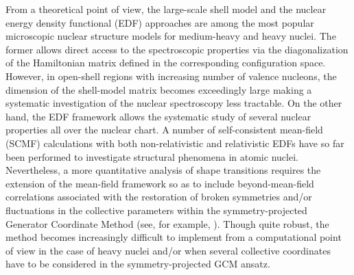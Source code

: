 \documentclass[twocolumn,showpacs,amsmath,amssymb,superscriptaddress]{revtex4-1}
\begin{document}
From a theoretical point of view,  the large-scale shell model 
\cite{caurier2005} and the nuclear energy density functional (EDF) 
\cite{bender2003} approaches are among the most popular microscopic 
nuclear structure models for medium-heavy and heavy nuclei. The former 
allows direct access to the spectroscopic properties via the 
diagonalization of the Hamiltonian matrix defined in the corresponding 
configuration space. However, in open-shell regions with increasing 
number of valence nucleons, the dimension of the shell-model matrix 
becomes exceedingly large making a systematic investigation of the 
nuclear spectroscopy less tractable. On the other hand, the EDF 
framework allows the systematic study of several nuclear properties all 
over the nuclear chart. A number of self-consistent mean-field (SCMF) 
calculations with both non-relativistic \cite{bender2003} and 
relativistic \cite{vretenar2005,niksic2011} EDFs have so far been 
performed to investigate structural phenomena in atomic  nuclei. 
Nevertheless, a more quantitative analysis of shape transitions 
requires the extension of the mean-field framework so as to include 
beyond-mean-field correlations associated with the restoration of 
broken symmetries and/or fluctuations in the collective parameters 
within the symmetry-projected Generator Coordinate Method (see, for 
example, \cite{rayner2002,bender2003,niksic2011}). Though quite robust, 
the method becomes increasingly difficult to implement from a 
computational point of view in the case of heavy nuclei and/or when 
several collective coordinates have to be considered in the 
symmetry-projected GCM ansatz.
\end{document}
